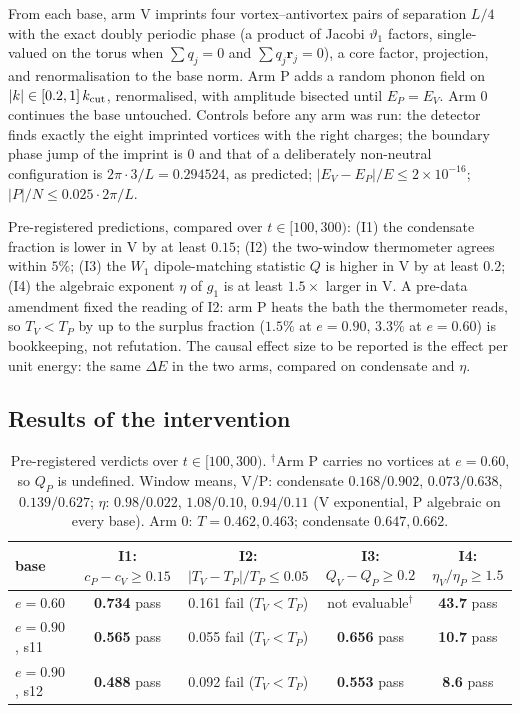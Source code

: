 \documentclass[11pt,a4paper]{article}
\begin{document}
From each base, arm V imprints four vortex--antivortex pairs of separation $L/4$ with the exact
doubly periodic phase (a product of Jacobi $\vartheta_1$ factors, single-valued on the torus when
$\sum q_j=0$ and $\sum q_j\mathbf r_j=0$), a core factor, projection, and renormalisation to the base
norm. Arm P adds a random phonon field on $|k|\in[0.2,1]\,k_{\rm cut}$, renormalised, with amplitude
bisected until $E_P=E_V$. Arm 0 continues the base untouched. Controls before any arm was run: the
detector finds exactly the eight imprinted vortices with the right charges; the boundary phase jump of
the imprint is $0$ and that of a deliberately non-neutral configuration is $2\pi\cdot3/L=0.294524$,
as predicted; $|E_V-E_P|/E\le2\times10^{-16}$; $|P|/N\le0.025\cdot2\pi/L$.

Pre-registered predictions, compared over $t\in[100,300)$: (I1) the condensate fraction is lower in V
by at least $0.15$; (I2) the two-window thermometer agrees within $5\%$; (I3) the $W_1$
dipole-matching statistic $Q$ is higher in V by at least $0.2$; (I4) the algebraic exponent $\eta$
of $g_1$ is at least $1.5\times$ larger in V. A pre-data amendment fixed the reading of I2: arm P
heats the bath the thermometer reads, so $T_V<T_P$ by up to the surplus fraction ($1.5\%$ at
$e=0.90$, $3.3\%$ at $e=0.60$) is bookkeeping, not refutation. The causal effect size to be reported
is the effect per unit energy: the same $\Delta E$ in the two arms, compared on condensate and $\eta$.

\subsection{Results of the intervention}\label{sec:results}

\begin{table}[h]\centering\small
\begin{tabular}{lcccc}
\toprule
base & I1: $c_P-c_V\ge0.15$ & I2: $|T_V-T_P|/T_P\le0.05$ & I3: $Q_V-Q_P\ge0.2$ & I4: $\eta_V/\eta_P\ge1.5$\\
\midrule
$e=0.60$ & \textbf{0.734} pass & 0.161 fail ($T_V<T_P$) & not evaluable$^\dagger$ & \textbf{43.7} pass\\
$e=0.90$, s11 & \textbf{0.565} pass & 0.055 fail ($T_V<T_P$) & \textbf{0.656} pass & \textbf{10.7} pass\\
$e=0.90$, s12 & \textbf{0.488} pass & 0.092 fail ($T_V<T_P$) & \textbf{0.553} pass & \textbf{8.6} pass\\
\bottomrule
\end{tabular}
\caption{Pre-registered verdicts over $t\in[100,300)$. $^\dagger$Arm P carries no vortices at
$e=0.60$, so $Q_P$ is undefined. Window means, V/P: condensate $0.168/0.902$, $0.073/0.638$,
$0.139/0.627$; $\eta$: $0.98/0.022$, $1.08/0.10$, $0.94/0.11$ (V exponential, P algebraic on every
base). Arm 0: $T=0.462, 0.463$; condensate $0.647, 0.662$.}
\end{table}
\end{document}
